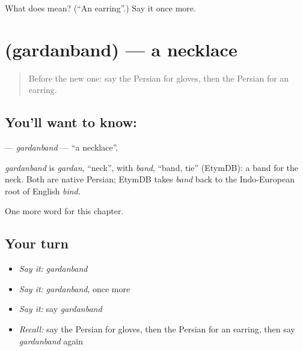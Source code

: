 \begin{tcolorbox}[breakable,colback=teal!4,colframe=teal!35!black,title={Before you move on}]
What does  mean? (\textquotedblleft{}An earring\textquotedblright{}.) Say it once more.
\end{tcolorbox}
\section[\texorpdfstring{\fa{گردنبند} (gardanband)}{گردنبند (gardanband)}]{ (gardanband) — a necklace}

\label{lesson:FA-C97-gardanband}



\begin{quote}
Before the new one: say the Persian for gloves, then the Persian for an earring.
\end{quote}

\subsection*{You'll want to know: }
\textbf{} — \emph{gardanband} — \textquotedblleft{}a necklace\textquotedblright{}.

\begin{cousinweb}
\emph{gardanband} is \emph{gardan}, \textquotedblleft{}neck\textquotedblright{}, with \emph{band}, \textquotedblleft{}band, tie\textquotedblright{} (EtymDB): a band for the neck. Both are native Persian; EtymDB takes \emph{band} back to the Indo-European root of English \emph{bind}.
\end{cousinweb}

\begin{grammarlens}[title={What you've built}]
One more word for this chapter.
\end{grammarlens}

\subsection*{Your turn}
\begin{itemize}
\raggedright
  \item \emph{Say it:} \emph{gardanband}
  \item \emph{Say it:} \emph{gardanband}, once more
  \item \emph{Say it:} say \emph{gardanband}
  \item \emph{Recall:} say the Persian for gloves, then the Persian for an earring, then say \emph{gardanband} again
\end{itemize}

